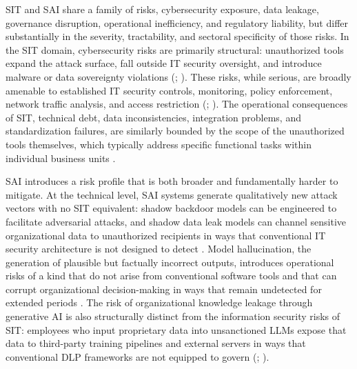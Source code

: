 \documentclass[12pt,oneside]{article}
\begin{document}
\ac{SIT} and \ac{SAI} share a family of risks, cybersecurity exposure, data leakage, governance disruption, operational inefficiency, and regulatory liability, but differ substantially in the severity, tractability, and sectoral specificity of those risks. In the \ac{SIT} domain, cybersecurity risks are primarily structural: unauthorized tools expand the attack surface, fall outside \ac{IT} security oversight, and introduce malware or data sovereignty violations (\citealp[1]{nwankpa2024shadow}; \citealp[278-280]{silic2014shadow}). These risks, while serious, are broadly amenable to established \ac{IT} security controls, monitoring, policy enforcement, network traffic analysis, and access restriction (\citealp[1029]{silic2017perspective}; \citealp[644]{walterbusch2017missing}). The operational consequences of \ac{SIT}, technical debt, data inconsistencies, integration problems, and standardization failures, are similarly bounded by the scope of the unauthorized tools themselves, which typically address specific functional tasks within individual business units \citep[3]{kopper2018business}.

\ac{SAI} introduces a risk profile that is both broader and fundamentally harder to mitigate. At the technical level, \ac{SAI} systems generate qualitatively new attack vectors with no \ac{SIT} equivalent: shadow backdoor models can be engineered to facilitate adversarial attacks, and shadow data leak models can channel sensitive organizational data to unauthorized recipients in ways that conventional \ac{IT} security architecture is not designed to detect \citep[973]{puthal2025shadowai}. Model hallucination, the generation of plausible but factually incorrect outputs, introduces operational risks of a kind that do not arise from conventional software tools and that can corrupt organizational decision-making in ways that remain undetected for extended periods \citep[1136]{raizada2026shadowai}. The risk of organizational knowledge leakage through generative \ac{AI} is also structurally distinct from the information security risks of \ac{SIT}: employees who input proprietary data into unsanctioned \ac{LLM}s expose that data to third-party training pipelines and external servers in ways that conventional \ac{DLP} frameworks are not equipped to govern (\citealp[1]{chin2025conflicting}; \citealp[2]{puthal2025shadowai}).
\end{document}
